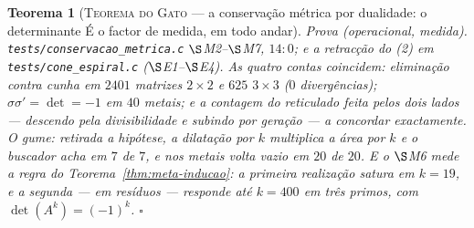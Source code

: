 \documentclass[11pt,a4paper]{article}
\newtheorem{teorema}{Teorema}
\newcommand{\code}[1]{\texttt{\small #1}}
\begin{document}
\begin{teorema}[\textsc{Teorema do Gato} --- a conservação métrica por
dualidade: o determinante É o factor de medida, em todo
andar]
\emph{Prova (operacional, medida).} \code{tests/conservacao\_metrica.c}
$\S$M2--$\S$M7, $14{:}0$; e a retracção do (2) em
\code{tests/cone\_espiral.c} ($\S$E1--$\S$E4). As quatro contas coincidem: eliminação contra
cunha em $2401$ matrizes $2\times2$ e $625$ $3\times3$ ($0$
divergências); $\sigma\sigma'=\det=-1$ em $40$ metais; e a contagem do
reticulado feita pelos \emph{dois} lados --- descendo pela
divisibilidade e subindo por geração --- a concordar exactamente. O gume:
retirada a hipótese, a dilatação por $k$ multiplica a área por $k$ e o
buscador acha em $7$ de $7$, e nos metais volta vazio em $20$ de $20$. E
o $\S$M6 mede a regra do Teorema~\ref{thm:meta-inducao}: a primeira
realização satura em $k=19$, e a segunda --- em resíduos --- responde
até $k=400$ em três primos, com $\det(A^{k})=(-1)^{k}$. $\square$
\end{teorema}
\end{document}
